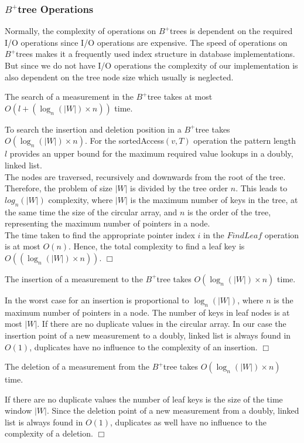 \documentclass[abstracton,12pt,oneside]{scrreprt}
\newenvironment{proof}
  {\noindent{\bf Proof:\rm}}{\hfill$\Box$\vspace{\medskipamount}}
\begin{document}
\subsubsection{$B^+$tree Operations}

Normally, the complexity of operations on $B^+$trees is dependent on the 
required I/O operations since I/O operations are expensive. The speed of operations on $B^+$trees makes it a frequently used index structure in database implementations. But since we do not have I/O operations the complexity of our implementation is also dependent on the tree node size which usually is neglected.


\begin{mydef}
	The search of a measurement in the $B^+$tree takes at most $O(l + (\log_{n}(|W|) \times n))$ time.
	\label{def1}
\end{mydef}
\begin{proof}
	To search the insertion and deletion position in a $B^+$tree takes $O(\log_{n}(|W|) \times n)$. For the sortedAccess$(v,T)$ operation the pattern length $l$ provides an upper bound for the maximum required value lookups in a doubly, linked list.\\ The nodes are traversed, recursively and downwards from the root of the tree. Therefore, the problem of size $|W|$ is divided by the tree order $n$. This leads to $log_n(|W|)$ complexity, where $|W|$ is the maximum number of keys in the tree, at the same time the size of the circular array, and $n$ is the order of the tree, representing the maximum number of pointers in a node. \\The time taken to find the appropriate pointer index $i$ in the $FindLeaf$ operation is at most $O(n)$. Hence, the total complexity to find a leaf key is $O((\log_{n}(|W|) \times n))$. 
\end{proof}

\begin{mydef}
	The insertion of a measurement to the $B^+$tree takes $O(\log_{n}(|W|) \times n)$ time.
\end{mydef}
\begin{proof}
	In the worst case for an insertion is proportional to $\log_{n}(|W|)$, where $n$ is the maximum number of pointers in a node. The number of keys in leaf nodes is at most $|W|$. If there are no duplicate values in the circular array. In our case the insertion point of a new measurement to a doubly, linked list is always found in $O(1)$, duplicates have no influence to the complexity of an insertion.  
\end{proof}
\begin{mydef}
	The deletion of a measurement from the $B^+$tree takes $O(\log_{n}(|W|) \times n)$ time.
\end{mydef}
\begin{proof}
	 If there are no duplicate values the number of leaf keys is the size of the time window $|W|$. Since the deletion point of a new measurement from a doubly, linked list is always found in $O(1)$, duplicates as well have no influence to the complexity of a deletion. 
\end{proof}
\end{document}
